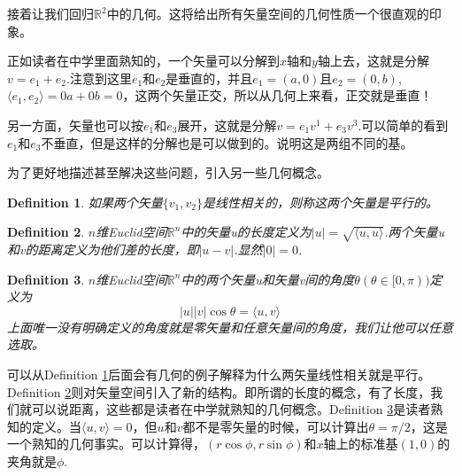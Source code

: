 \documentclass[11pt,a4paper,openany]{book}%
\theoremstyle{plain}%
\newtheorem{defi}{Definition}[chapter]%
\begin{document}
接着让我们回归$\mathbb{R}^{2}$中的几何。这将给出所有矢量空间的几何性质一个很直观的印象。\\
\begin{center}
\end{center}
\indent 正如读者在中学里面熟知的，一个矢量可以分解到$x$轴和$y$轴上去，这就是分解$v=e_1+e_2$.注意到这里$e_1$和$e_2$是垂直的，并且$e_1=(a,0)$且$e_2=(0,b)$,$\langle e_1,e_2\rangle=0a+0b=0$，这两个矢量正交，所以从几何上来看，正交就是垂直！

另一方面，矢量也可以按$e_1$和$e_3$展开，这就是分解$v=e_1v^1+e_3v^3$.可以简单的看到$e_1$和$e_3$不垂直，但是这样的分解也是可以做到的。说明这是两组不同的基。

为了更好地描述甚至解决这些问题，引入另一些几何概念。
\begin{defi}
\label{平行}
如果两个矢量$\{v_1,v_2\}$是线性相关的，则称这两个矢量是平行的。
\end{defi}
\begin{defi}
\label{长度}
$n$维Euclid空间$\mathbb{R}^{n}$中的矢量u的长度定义为$|u|=\sqrt{\langle u,u\rangle}$.两个矢量u和v的距离定义为他们差的长度，即$|u-v|$.显然$|0|=0$.
\end{defi}
\begin{defi}
\label{角度}
$n$维Euclid空间$\mathbb{R}^{n}$中的两个矢量u和矢量v间的角度$\theta$$(\theta \in [0,\pi))$定义为
\[
|u||v|\cos \theta=\langle u,v \rangle
\]
上面唯一没有明确定义的角度就是零矢量和任意矢量间的角度，我们让他可以任意选取。
\end{defi}

\indent 可以从Definition \ref{平行}后面会有几何的例子解释为什么两矢量线性相关就是平行。Definition \ref{长度}则对矢量空间引入了新的结构。即所谓的长度的概念，有了长度，我们就可以说距离，这些都是读者在中学就熟知的几何概念。Definition \ref{角度}是读者熟知的定义。当$\langle u,v \rangle=0$，但$u$和$v$都不是零矢量的时候，可以计算出$\theta=\pi/2$，这是一个熟知的几何事实。可以计算得，$(r\cos \phi,r\sin \phi)$和$x$轴上的标准基$(1,0)$的夹角就是$\phi$.
\end{document}
